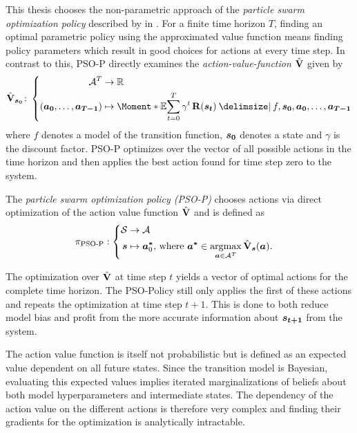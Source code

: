 This thesis chooses the non-parametric approach of the \emph{particle swarm optimization policy} described by \citeauthor{hein_reinforcement_2016} in \cite{hein_reinforcement_2016}.
For a finite time horizon $T$, finding an optimal parametric policy using the approximated value function means finding policy parameters which result in good choices for actions at every time step.
In contrast to this, PSO-P directly examines the \emph{action-value-function $\operatorname{\hat{\operatorname{\mathbf{V}}}}$} given by
\begin{align}
    \label{eq:action_value_function}
    \AVlu_{\mat{s_0}} \colon \left\{
        \begin{aligned}
            \Ah^T &\to \R \\
            \left( \mat{a_0}, \dots, \mat{a_{T-1}} \right) &\mapsto \Moment*{\E}{\sum_{t=0}^T \gamma^t \Rwd(\mat{s_t}) \given f, \mat{s_0}, \mat{a_0}, \dots, \mat{a_{T-1}}}
        \end{aligned}
    \right.
\end{align}
where $f$ denotes a model of the transition function, $\bm{s_0}$ denotes a state and $\gamma$ is the discount factor.
PSO-P optimizes over the vector of all possible actions in the time horizon and then applies the best action found for time step zero to the system.
\begin{definition}[PSO-P]
    \label{def:psop}
    The \emph{particle swarm optimization policy (PSO-P)} \cite{hein_reinforcement_2016} chooses actions via direct optimization of the action value function $\operatorname{\hat{\operatorname{\mathbf{V}}}}$ and is defined as
    \begin{align}
        \pi_{\text{PSO-P}} &: \left\{
            \begin{aligned}
                \Es &\to \Ah\\
                \mat{s} &\mapsto \mat{a^\ast}_0 \text{, where } \mat{a^\ast} \in \argmax_{\mat{a} \in \Ah^T} \AVlu_{\mat{s}}(\mat{a}).
            \end{aligned}
        \right.
    \end{align}
\end{definition}
The optimization over $\operatorname{\hat{\operatorname{\mathbf{V}}}}$ at time step $t$ yields a vector of optimal actions for the complete time horizon.
The PSO-Policy still only applies the first of these actions and repeats the optimization at time step $t+1$.
This is done to both reduce model bias and profit from the more accurate information about $\bm{s_{t+1}}$ from the system.

The action value function is itself not probabilistic but is defined as an expected value dependent on all future states.
Since the transition model is Bayesian, evaluating this expected values implies iterated marginalizations of beliefs about both model hyperparameters and intermediate states.
The dependency of the action value on the different actions is therefore very complex and finding their gradients for the optimization is analytically intractable.

